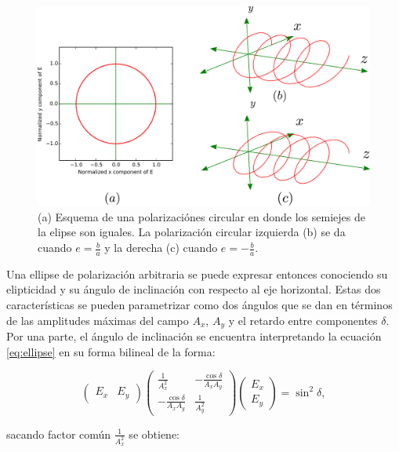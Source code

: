 \begin{figure}
\centering
\includegraphics[scale=.5]{circular_polarizations}
\caption{(a) Esquema de una polarizaciónes circular en donde los semiejes
  de la elipse son iguales. La polarización circular izquierda (b) se da
cuando $e=\frac{b}{a}$ y la derecha (c) cuando  $e=-\frac{b}{a}$.}
\label{fig:circular_polarizations}
\end{figure}

Una ellipse de polarización arbitraria se puede expresar entonces conociendo su
elipticidad y su ángulo de inclinación con respecto al eje
horizontal. Estas dos características se pueden parametrizar como dos
ángulos que se dan en
términos de las amplitudes máximas del campo $A_x$, $A_y$
y el retardo entre componentes $\delta$. Por una parte, el ángulo de
inclinación se encuentra interpretando la ecuación \ref{eq:ellipse} en
su forma bilineal de la forma:

\begin{equation}
\begin{pmatrix}
E_x & E_y
\end{pmatrix}
\begin{pmatrix}
\frac{1}{A_x^2} & -\frac{\cos{\delta}}{A_xA_y}\\
 -\frac{\cos{\delta}}{A_xA_y} & \frac{1}{A_y^2} 
\end{pmatrix}
\begin{pmatrix}
E_x \\ E_y
\end{pmatrix}
=\sin^2{\delta},
\end{equation}

sacando factor común $\frac{1}{A_x^2} $ se obtiene:

